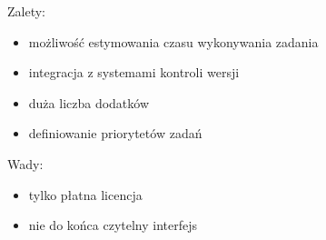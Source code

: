 Zalety:
\begin{itemize}
\item możliwość estymowania czasu wykonywania zadania
\item integracja z systemami kontroli wersji
\item duża liczba dodatków
\item definiowanie priorytetów zadań
\end{itemize}

Wady:
\begin{itemize}
\item tylko płatna licencja
\item nie do końca czytelny interfejs
\end{itemize}